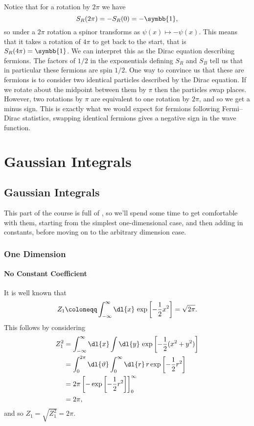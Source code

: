 \documentclass[fleqn]{NotesClass}
\newcommand{\ident}{\symbb{1}}
\begin{document}
    Notice that for a rotation by \(2\pi\) we have
    \begin{equation}
        S_R(2\pi) = -S_R(0) = -\ident,
    \end{equation}
    so under a \(2\pi\) rotation a spinor transforms as \(\psi(x) \mapsto -\psi(x)\).
    This means that it takes a rotation of \(4\pi\) to get back to the start, that is \(S_R(4\pi) = \ident\).
    We can interpret this as the Dirac equation describing fermions.
    The factors of \(1/2\) in the exponentials defining \(S_R\) and \(S_B\) tell us that in particular these fermions are spin \(1/2\).
    One way to convince us that these are fermions is to consider two identical particles described by the Dirac equation.
    If we rotate about the midpoint between them by \(\pi\) then the particles swap places.
    However, two rotations by \(\pi\) are equivalent to one rotation by \(2\pi\), and so we get a minus sign.
    This is exactly what we would expect for fermions following Fermi--Dirac statistics, swapping identical fermions gives a negative sign in the wave function.
    
    \part{Gaussian Integrals}
    \chapter{Gaussian Integrals}
    This part of the course is full of , so we'll spend some time to get comfortable with them, starting from the simplest one-dimensional case, and then adding in constants, before moving on to the arbitrary dimension case.
    \section{One Dimension}
    \subsection{No Constant Coefficient}
    It is well known that
    \begin{equation}
        Z_{1} \coloneqq \int_{-\infty}^{\infty} \dl{x} \, \exp\left[ -\frac{1}{2}x^2 \right] = \sqrt{2\pi}.
    \end{equation}
    This follows by considering
    \begin{align}
        Z_{1}^2 &= \int_{-\infty}^{\infty} \dl{x} \int \dl{y} \, \exp\left[ -\frac{1}{2}(x^2 + y^2) \right]\\
        &= \int_{0}^{2\pi} \dl{\vartheta} \int_{0}^{\infty} \dl{r} \, r \exp\left[ -\frac{1}{2}r^2 \right]\\
        &= 2\pi \left[ -\exp\left[ -\frac{1}{2}r^2 \right] \right]_{0}^{\infty}\\
        &= 2\pi,
    \end{align}
    and so \(Z_1 = \sqrt{Z_1^2} = 2\pi\).
    
\end{document}
